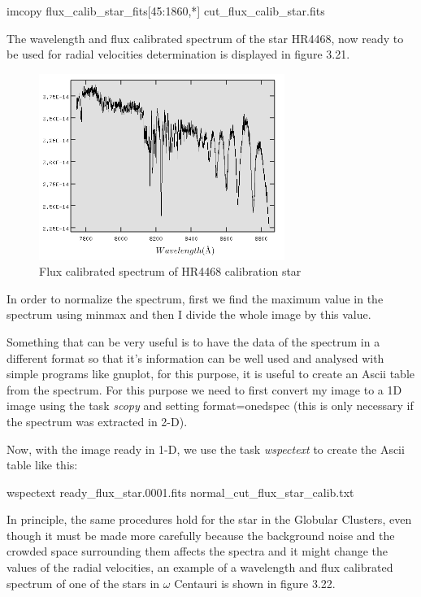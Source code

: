 \begin{center}
imcopy flux\_calib\_star\_fits[45:1860,*] cut\_flux\_calib\_star.fits
\end{center}

The wavelength and flux calibrated spectrum of the star HR4468, now ready to be used for radial velocities determination is displayed in figure 3.21.

\begin{figure}[H]
\centering
\includegraphics[width=8cm]{images/calib_star_flux.png}
\caption[Flux calibrated spectrum of HR4468]{Flux calibrated spectrum of HR4468 calibration star}
\end{figure}

In order to normalize the spectrum, first we find the maximum value in the spectrum using minmax and then I divide the whole image by this value. 

Something that can be very useful is to have the data of the spectrum in a different format so that it's information can be well used and analysed with simple programs like gnuplot, for this purpose, it is useful to create an Ascii table from the spectrum. For this purpose we need to first convert my image to a 1D image using the task \textit{scopy} and setting format=onedspec (this is only necessary if the spectrum was extracted in 2-D).

Now, with the image ready in 1-D, we use the task \textit{wspectext} to create the Ascii table like this:

\begin{center}
wspectext ready\_flux\_star.0001.fits normal\_cut\_flux\_star\_calib.txt
\end{center}

In principle, the same procedures hold for the star in the Globular Clusters, even though it must be made more carefully because the background noise and the crowded space surrounding them affects the spectra and it might change the values of the radial velocities, an example of a wavelength and flux calibrated spectrum of one of the stars in $\omega$ Centauri is shown in figure 3.22.

